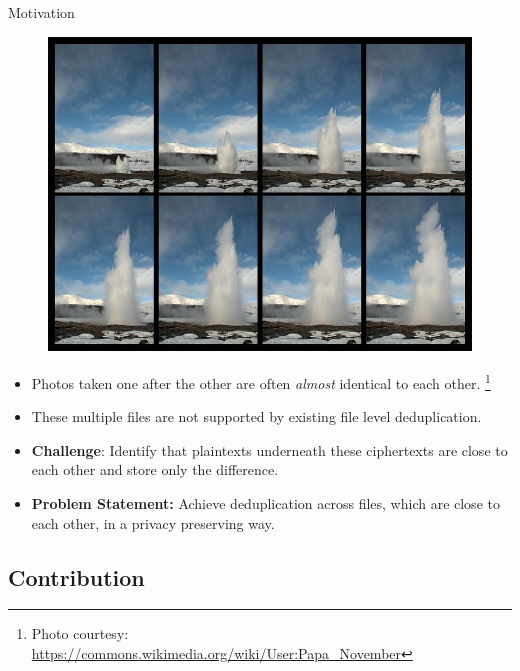 \documentclass{beamer}
\newcommand\blfootnote[1]{%
  \begingroup
  \renewcommand\thefootnote{}\footnote{#1}%
  \addtocounter{footnote}{-1}%
  \endgroup
}
\begin{document}
\begin{frame}[allowframebreaks]{Motivation}
\begin{figure}
    \includegraphics[scale=0.25]{burst.jpg}
\end{figure}
\begin{itemize}
	\setlength\itemsep{1em}
	\item Photos taken one after the other are often \textit{almost} identical to each other.\blfootnote{Photo courtesy: \url{https://commons.wikimedia.org/wiki/User:Papa_November}}
	\item These multiple files are not supported by existing file level deduplication.
	\item \textbf{Challenge}: Identify that plaintexts underneath these ciphertexts are 
		close to each other and store only the difference.
    \item \textbf{Problem Statement: }Achieve deduplication across files, which are close to each other, in a privacy preserving way.
\end{itemize}
\end{frame}

\subsection{Contribution}
\end{document}
